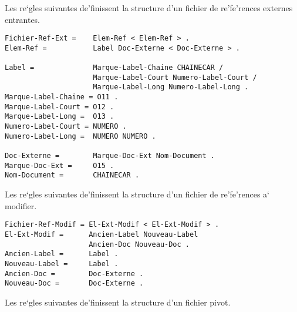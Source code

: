 Les re`gles suivantes de'finissent la structure d'un fichier de re'fe'rences
externes entrantes.

\begin{verbatim}
Fichier-Ref-Ext =    Elem-Ref < Elem-Ref > .
Elem-Ref =           Label Doc-Externe < Doc-Externe > .

Label =              Marque-Label-Chaine CHAINECAR /
                     Marque-Label-Court Numero-Label-Court /
                     Marque-Label-Long Numero-Label-Long .
Marque-Label-Chaine = O11 .
Marque-Label-Court = O12 .
Marque-Label-Long =  O13 .
Numero-Label-Court = NUMERO .
Numero-Label-Long =  NUMERO NUMERO .

Doc-Externe =        Marque-Doc-Ext Nom-Document .
Marque-Doc-Ext =     O15 .
Nom-Document =       CHAINECAR .
\end{verbatim}

Les re`gles suivantes de'finissent la structure d'un fichier de re'fe'rences
a` modifier.

\begin{verbatim}
Fichier-Ref-Modif = El-Ext-Modif < El-Ext-Modif > .
El-Ext-Modif =      Ancien-Label Nouveau-Label
                    Ancien-Doc Nouveau-Doc .
Ancien-Label =      Label .
Nouveau-Label =     Label .
Ancien-Doc =        Doc-Externe .
Nouveau-Doc =       Doc-Externe .
\end{verbatim}

Les re`gles suivantes de'finissent la structure d'un fichier pivot.

